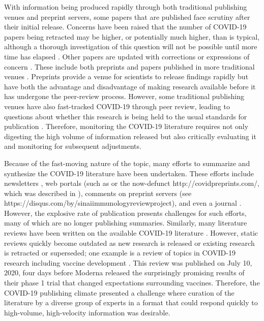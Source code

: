 \documentclass[sigconf]{acmart}
\begin{document}
With information being produced rapidly through both traditional publishing venues and preprint servers, some papers that are published face scrutiny after their initial release.
Concerns have been raised that the number of COVID-19 papers being retracted may be higher, or potentially much higher, than is typical, although a thorough investigation of this question will not be possible until more time has elapsed \citep{ZUk10707, caxpZEmy}.
Other papers are updated with corrections or expressions of concern \citep{caxpZEmy, hfAF6aDr}.
These include both preprints and papers published in more traditional venues \citep{hfAF6aDr, paRLhIdE}.
Preprints provide a venue for scientists to release findings rapidly but have both the advantage and disadvantage of making research available before it has undergone the peer-review process.
However, some traditional publishing venues have also fast-tracked COVID-19 through peer review, leading to questions about whether this research is being held to the usual standards for publication \citep{1Dez1ZOc5}.
Therefore, monitoring the COVID-19 literature requires not only digesting the high volume of information released but also critically evaluating it and monitoring for subsequent adjustments.

Because of the fast-moving nature of the topic, many efforts to summarize and synthesize the COVID-19 literature have been undertaken.
These efforts include newsletters \citetext{\citealp{d204tUzq}; \citealp{JdWiPJCL}}, web portals (such as \citep{m4B8roc9, 1CBWvhTdy} or the now-defunct http://covidpreprints.com/, which was described in \citep{paRLhIdE}), comments on preprint servers \citep{YZ4cHNuH} (see https://disqus.com/by/sinaiimmunologyreviewproject), and even a journal \citep{oBoqEGzZ}.
However, the explosive rate of publication presents challenges for such efforts, many of which are no longer publishing summaries.
Similarly, many literature reviews have been written on the available COVID-19 literature \citep{I2EsJmfs, 5x25saIz, evtsR3C5, 5x25saIz, 18eCxyLhx, SAE5ME3N, xOs5ctsW}.
However, static reviews quickly become outdated as new research is released or existing research is retracted or superseded; one example is a review of topics in COVID-19 research including vaccine development \citep{xOs5ctsW}.
This review was published on July 10, 2020, four days before Moderna released the surprisingly promising results of their phase 1 trial \citep{wiGjCZC8} that changed expectations surrounding vaccines.
Therefore, the COVID-19 publishing climate presented a challenge where curation of the literature by a diverse group of experts in a format that could respond quickly to high-volume, high-velocity information was desirable.
\end{document}
